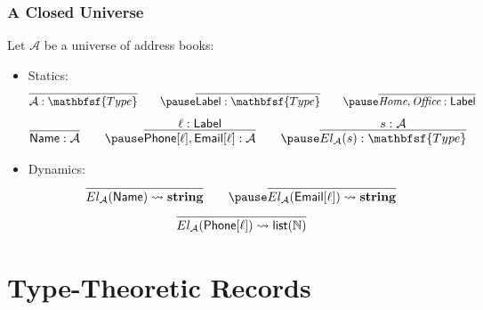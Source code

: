 \documentclass[tikz, 12pt]{beamer}
\def\Type{\mathbfsf{Type}}
\begin{document}
\begin{frame}
  \frametitle{A Closed Universe}
  \pause
  Let $\mathcal{A}$ be a universe of address books:
  \pause
  \begin{itemize}
    \item Statics:
      \pause
      \[
        \infer{\mathcal{A} : \Type}{}
        \qquad
        \pause
        \infer{\textsf{Label} : \Type}{}
        \qquad
        \pause
        \infer{\textit{Home}, \textit{Office} : \textsf{Label}}{}
      \]
      \pause
      \[
        \infer{\textsf{Name} : \mathcal{A}}{}
        \qquad
        \pause
        \infer{\textsf{Phone}[\ell],\textsf{Email}[\ell] : \mathcal{A}}{\ell : \textsf{Label}}
        \qquad
        \pause
        \infer{El_\mathcal{A}(s) : \Type}{s : \mathcal{A}}
      \]
      \pause
    \item Dynamics:
      \pause
      \[
        \infer{El_\mathcal{A}(\textsf{Name}) \leadsto \mathbf{string}}{}
        \qquad
        \pause
        \infer{El_\mathcal{A}(\textsf{Email}[\ell]) \leadsto \mathbf{string}}{}
      \]
      \pause
      \[
        \infer{El_\mathcal{A}(\textsf{Phone}[\ell]) \leadsto \mathsf{list}(\mathbb{N})}{}
      \]
  \end{itemize}
\end{frame}


\section{Type-Theoretic Records}
\end{document}
